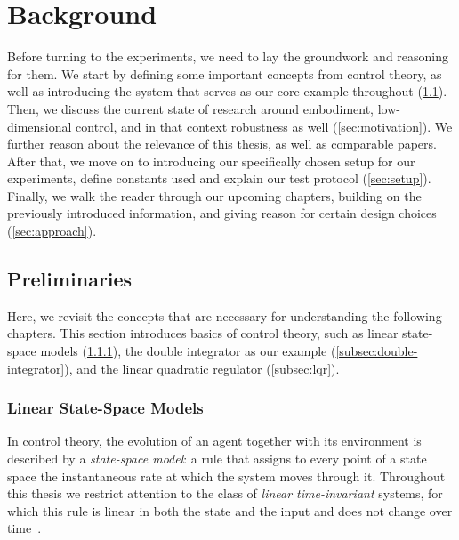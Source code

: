 \chapter{Background}
\label{chap:background}

Before turning to the experiments, we need to lay the groundwork and
reasoning for them. We start by defining some important concepts from
control theory, as well as introducing the system that serves as our
core example throughout (\cref{sec:preliminaries}). Then, we discuss
the current state of research around embodiment, low-dimensional
control, and in that context robustness as well (\cref{sec:motivation}).
We further reason about the relevance of this thesis, as well as comparable
papers. After that, we move on to introducing our specifically chosen
setup for our experiments, define constants used and explain
our test protocol (\cref{sec:setup}). Finally, we walk the reader
through our upcoming chapters, building on the previously introduced
information, and giving reason for certain design choices (\cref{sec:approach}).

\section{Preliminaries}
\label{sec:preliminaries}

Here, we revisit the concepts that are necessary for understanding the
following chapters. This section introduces basics of control theory, such as
linear state-space models (\cref{subsec:state-space}), the double
integrator as our example (\cref{subsec:double-integrator}), and the
linear quadratic regulator (\cref{subsec:lqr}).

\subsection{Linear State-Space Models}
\label{subsec:state-space}
 
In control theory, the evolution of an agent together with its environment is
described by a \emph{state-space model}: a rule that assigns to every point of
a state space the instantaneous rate at which the system moves through it.
Throughout this thesis we restrict attention to the class of
\emph{linear time-invariant} systems, for which this rule is linear in
both the state and the input and does not change over time~\cite[pp.~3--4]{Werner2021Control}.

